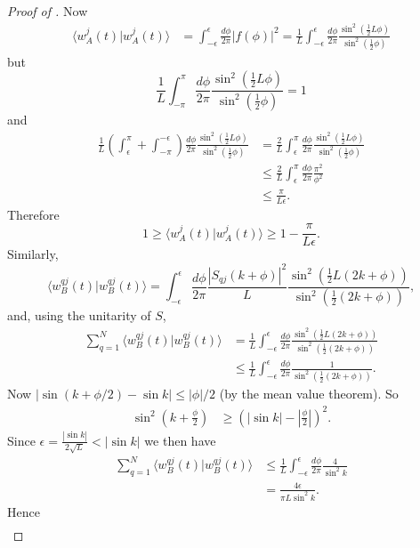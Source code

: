 \documentclass[../thesis-main/thesis-main]{subfiles}
\begin{document}
\begin{proof}[Proof of {}]
Now
\begin{align*}
\langle w_{A}^{j}(t)|w_{A}^{j}(t)\rangle & = \int_{-\epsilon}^{\epsilon}\frac{d\phi}{2\pi}\left|f(\phi)\right|^{2}
 = \frac{1}{L} \int_{-\epsilon}^{\epsilon}\frac{d\phi}{2\pi}\frac{\sin^{2}(\frac{1}{2}L\phi)}{\sin^{2}(\frac{1}{2}\phi)}
 \end{align*}
but
\[
\frac{1}{L} \int_{-\pi}^{\pi}\frac{d\phi}{2\pi}\frac{\sin^{2}(\frac{1}{2}L\phi)}{\sin^{2}(\frac{1}{2}\phi)}=1
\]
and
\begin{align}
\frac{1}{L}\left(\int_{\epsilon}^{\pi}+\int_{-\pi}^{-\epsilon}\right)\frac{d\phi}{2\pi}\frac{\sin^{2}(\frac{1}{2}L\phi)}{\sin^{2}(\frac{1}{2}\phi)} & = \frac{2}{L} \int_{\epsilon}^{\pi}\frac{d\phi}{2\pi}\frac{\sin^{2}(\frac{1}{2}L\phi)}{\sin^{2}(\frac{1}{2}\phi)}\nonumber \\
 & \leq \frac{2}{L}\int_{\epsilon}^{\pi}\frac{d\phi}{2\pi}\frac{\pi^{2}}{\phi^{2}}\nonumber \\
 & \leq \frac{\pi}{L\epsilon}.\label{eq:fbound}
\end{align}
Therefore
\[
1\geq\langle w_{A}^{j}(t)|w_{A}^{j}(t)\rangle\geq1-\frac{\pi}{L\epsilon}.
\]
Similarly,
\[
\langle w_{B}^{qj}(t)|w_{B}^{qj}(t)\rangle=\int_{-\epsilon}^{\epsilon}\frac{d\phi}{2\pi}\frac{\left|S_{qj}(k+\phi)\right|^{2}}{L}\frac{\sin^{2}(\frac{1}{2}L(2k+\phi))}{\sin^{2}(\frac{1}{2}(2k+\phi))},\]
and, using the unitarity of $S$,
\begin{align*}
\sum_{q=1}^{N}\langle w_{B}^{qj}(t)|w_{B}^{qj}(t)\rangle & = \frac{1}{L}\int_{-\epsilon}^{\epsilon}\frac{d\phi}{2\pi}\frac{\sin^{2}(\frac{1}{2}L(2k+\phi))}{\sin^{2}(\frac{1}{2}(2k+\phi))}\\
 & \leq \frac{1}{L} \int_{-\epsilon}^{\epsilon}\frac{d\phi}{2\pi}\frac{1}{\sin^{2}(\frac{1}{2}(2k+\phi))}.
\end{align*}
Now $|{\sin(k+{\phi}/{2}) - \sin k}| \leq {|\phi|}/{2}$ (by the mean value theorem). So
\begin{align*}
\sin^{2}\left(k+\frac{\phi}{2}\right) & \geq \left(\left|\sin k\right|-\left|\frac{\phi}{2}\right|\right)^{2}.
\end{align*}
Since $\epsilon=\frac{\left|\sin k\right|}{2\sqrt{L}}<\left|\sin k\right|$
we then have \begin{align*}
\sum_{q=1}^{N}\langle w_{B}^{qj}(t)|w_{B}^{qj}(t)\rangle & \leq \frac{1}{L} \int_{-\epsilon}^{\epsilon}\frac{d\phi}{2\pi}\frac{4}{\sin^{2}k}\\
 & = \frac{4\epsilon}{\pi L\sin^{2}k}.\end{align*}
 Hence \begin{align*}

\end{align*}
\end{proof}
\end{document}
